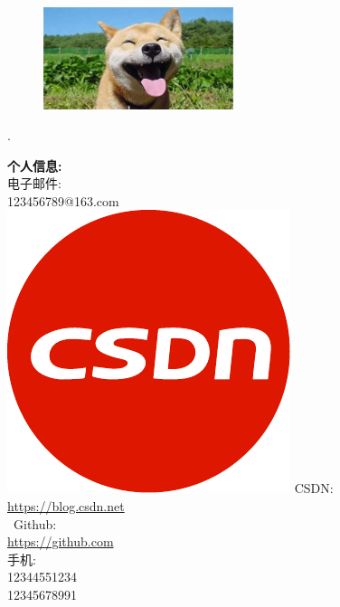 \documentclass[a4paper,12pt,final,UTF8,fontset=macnew]{memoir}
\newcommand{\myThemeColor}{RoyalBlue}
\newcommand{\CVItem}[1]
	{\textbf{\color{\myThemeColor} #1}}
\begin{document}
\linespread{1.15}\selectfont
\begin{figure}
\centering
	\includegraphics[width=0.8\columnwidth,height=3cm]{ha.jpg}
\vspace{-7cm}
\end{figure}
\begin{flushright}\footnotesize
.\\
\vskip 6cm
    \raggedright
	\CVItem{{\large \faInfoCircle 个人信息:}}\\[1em]
	{			
	\textcolor{blue}{\faEnvelope} 电子邮件:\\
	123456789@163.com \\					%
	 \includegraphics[scale=0.07]{csdn.pdf} \hspace{-0.2em} CSDN:\\	
	 \href{https://blog.csdn.net}{\small https://blog.csdn.net} \\	%
	\faGithub  \ Github:\\
	\href{https://github.com}{\small https://github.com}   \\			%
	\textcolor{red}{\faPhone}手机:\\							%
	12344551234\\
	12345678991 \\ }


\end{flushright}
\end{document}
